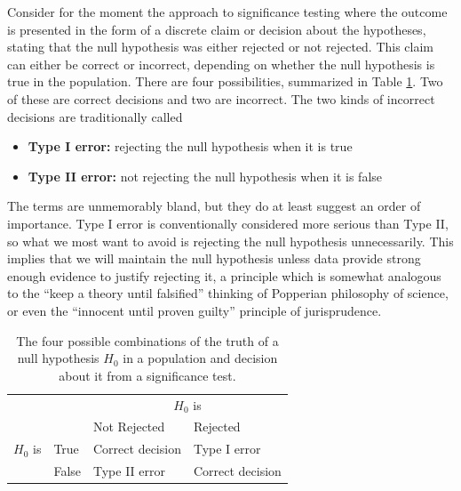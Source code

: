 Consider for the moment the approach to significance testing where the
outcome is presented in the form of a discrete claim or
decision about the hypotheses, stating that the null hypothesis was
either rejected or not rejected. This claim can either be correct or
incorrect, depending on whether the null hypothesis is true in the
population. There are four possibilities, summarized in Table
\ref{t_twoerrors}. Two of these are correct decisions and two are
incorrect. The two kinds of incorrect decisions are traditionally called
\begin{itemize}
\item
\textbf{Type I error:} rejecting the null hypothesis when it is true
\item
\textbf{Type II error:} not rejecting the null hypothesis when it is
false
\end{itemize}
The terms are unmemorably bland, but they do at least suggest an order
of importance. Type I error is conventionally
considered more serious than Type II, so what we most want to avoid is
rejecting the null hypothesis unnecessarily. This implies that we will
maintain the null hypothesis unless data provide strong enough evidence
to justify rejecting it, a principle which is somewhat analogous to the
``keep a theory until falsified'' thinking of Popperian philosophy of
science, or even the ``innocent until proven guilty'' principle of
jurisprudence.

\begin{table}
\caption{The four possible combinations of the truth of a null hypothesis $H_{0}$ in a population and decision about it from a significance test.}
\label{t_twoerrors}
\begin{center}
\begin{tabular}{|ll|ll|}\hline
& & \multicolumn{2}{|c|}{$H_{0}$ is} \\
& & Not Rejected & Rejected \\  \hline
$H_{0}$ is & True & Correct decision & Type I error \\
& False & Type II error & Correct decision \\
\hline
\end{tabular}
\end{center}
\end{table}

